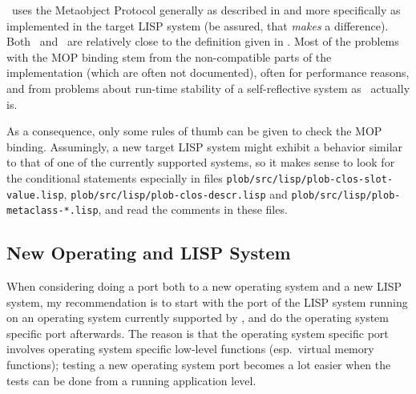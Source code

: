 \plob\ uses the Metaobject Protocol generally as described in
\cite{bib:AMOP} and more specifically as implemented in the target
LISP system (be assured, that \emph{makes} a difference). Both \lwcl\
and \allegrocl\ are relatively close to the definition given in
\cite{bib:AMOP}. Most of the problems with the MOP binding stem from
the non-compatible parts of the implementation (which are often not
documented), often for performance reasons, and from problems about
run-time stability of a self-reflective system as \clos\ actually is.

As a consequence, only some rules of thumb can be given to check the
MOP binding. Assumingly, a new target LISP system might exhibit a
behavior similar to that of one of the currently supported systems, so
it makes sense to look for the conditional statements especially in
files \texttt{plob/src/lisp/plob-clos-slot-value.lisp},
\texttt{plob/src/lisp/plob-clos-descr.lisp} and
\texttt{plob/src/lisp/plob-metaclass-*.lisp}, and read the comments
in these files.

\subsection{New Operating and LISP System}

When considering doing a port both to a new operating system and a new
LISP system, my recommendation is to start with the port of the LISP
system running on an operating system currently supported by \plob,
and do the operating system specific port afterwards. The reason is
that the operating system specific port involves operating system
specific low-level functions (esp.\ virtual memory functions); testing
a new operating system port becomes a lot easier when the tests can be
done from a running application level.

\clearpage\thispagestyle{plain}\cleardoublepage%

